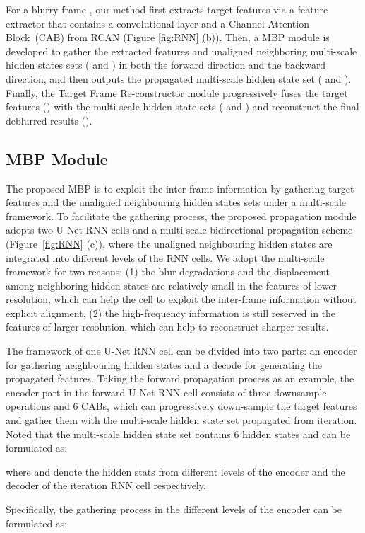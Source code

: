 \documentclass[letterpaper]{article} \usepackage{aaai22}  \usepackage{times}  \usepackage{helvet}  \usepackage{courier}  \usepackage[hyphens]{url}  \usepackage{graphicx} \urlstyle{rm} \def\UrlFont{\rm}  \usepackage{natbib}  \usepackage{caption} \DeclareCaptionStyle{ruled}{labelfont=normalfont,labelsep=colon,strut=off} \frenchspacing  \setlength{\pdfpagewidth}{8.5in}  \setlength{\pdfpageheight}{11in}  \newcommand{\hang}{\textcolor[rgb]{0.98,0.5,0.04}}
\begin{document}
For a blurry frame , our method first extracts target features  via a feature extractor that contains a convolutional layer and a Channel Attention Block~(CAB) from RCAN \cite{rcan} (Figure \ref{fig:RNN} (b)).
Then, a MBP module is developed to gather the extracted features  and unaligned neighboring multi-scale hidden states sets ( and ) in both the forward direction and the backward direction, and then outputs the propagated multi-scale hidden state set ( and ).
Finally, the Target Frame Re-constructor module progressively fuses the target features () with the multi-scale hidden state sets ( and ) and reconstruct the final deblurred results ().


\subsection{MBP Module}
The proposed MBP is to exploit the inter-frame information by gathering target features and the unaligned neighbouring hidden states sets under a multi-scale framework.
To facilitate the gathering process, the proposed propagation module adopts two U-Net RNN cells and a multi-scale bidirectional propagation scheme (Figure~\ref{fig:RNN} (c)), where the unaligned neighbouring hidden states are integrated into different levels of the RNN cells. 
We adopt the multi-scale framework for two reasons:
(1) the blur degradations and the displacement among neighboring hidden states are relatively small in the features of lower resolution, which can help the cell to exploit the inter-frame information without explicit alignment, 
(2) the high-frequency information is still reserved in the features of larger resolution, which can help to reconstruct sharper results. 

The framework of one U-Net RNN cell can be divided into two parts: an encoder for gathering neighbouring hidden states and a decode for generating the propagated features.
Taking the forward propagation process as an example,
the encoder part in the forward U-Net RNN cell consists of three downsample operations and 6 CABs, which can progressively down-sample the target features  and gather them with the multi-scale hidden state set  propagated from  iteration.
Noted that the multi-scale hidden state set  contains 6 hidden states and can be formulated as:

where  and  denote the hidden stats from different levels of the encoder and the decoder of the  iteration RNN cell respectively.

Specifically, the gathering process in the different levels of the encoder can be formulated as:
\end{document}
